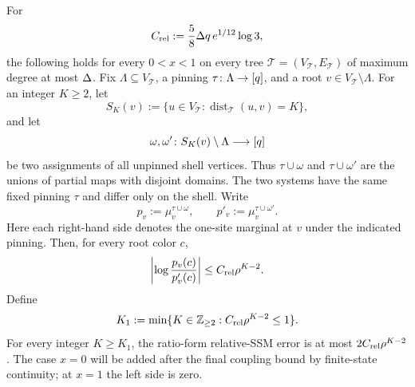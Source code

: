 \begin{lemma}
\label{lem:hg-eventual-relative-ssm}
For
\begin{equation}
 C_{\rm rel}:=\frac58\Delta q\,e^{1/12}\log3,
 \label{eq:hg-relative-constant}
\end{equation}
the following holds for every $0<x<1$ on every tree
\(\mathcal T=(V_{\mathcal T},E_{\mathcal T})\) of maximum degree at
most $\Delta$.  Fix \(\Lambda\subseteq V_{\mathcal T}\), a pinning
\(\tau\colon\Lambda\to[q]\), and a root
\(v\in V_{\mathcal T}\setminus\Lambda\).  For an integer \(K\ge2\), let
\[
  S_K(v):=
  \{u\in V_{\mathcal T}:
       \operatorname{dist}_{\mathcal T}(u,v)=K\},
\]
and let
\[
 \omega,\omega'\colon S_K(v)\setminus\Lambda\longrightarrow
 [q]
\]
be two assignments of all unpinned shell vertices.  Thus
\(\tau\cup\omega\) and \(\tau\cup\omega'\) are the unions of partial maps with
disjoint domains.  The two systems have the same fixed pinning \(\tau\) and
differ only on the shell.  Write
\[
 p_v:=\mu_v^{\tau\cup\omega},
 \qquad
 p'_v:=\mu_v^{\tau\cup\omega'}.
\]
Here each right-hand side denotes the one-site marginal at \(v\) under the
indicated pinning.
Then, for every root color $c$,
\begin{equation}
 \left|\log\frac{p_v(c)}{p'_v(c)}\right|
 \le C_{\rm rel}\rho^{K-2}.
 \label{eq:hg-eventual-relative-ssm}
\end{equation}
Define
\[
 K_1:=\min\{K\in\mathbb Z_{\ge2}:C_{\rm rel}\rho^{K-2}\le1\}.
\]
For every integer \(K\ge K_1\), the ratio-form relative-SSM error is at most
\(2C_{\rm rel}\rho^{K-2}\).
The case \(x=0\) will be added after the final coupling bound by
finite-state continuity; at \(x=1\) the left side is zero.
\end{lemma}

